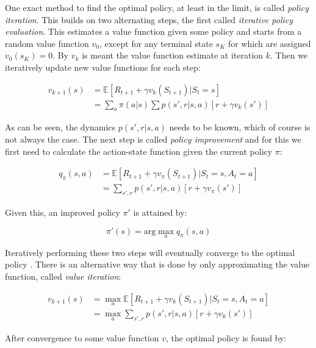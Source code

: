One exact method to find the optimal policy, at least in the limit, is called
\textit{policy iteration}. This builds on two alternating steps, the first
called \textit{iterative policy evaluation}. This estimates a value function
given some policy and starts from a random value function $v_0$, except for any
terminal state $s_K$ for which are assigned $v_0(s_K) = 0$. By $v_k$ is meant
the value function estimate at iteration $k$. Then we iteratively update new
value functions for each step:

\begin{align*}
    v_{k+1}(s) &= \mathbb{E}\left[R_{t+1} + \gamma v_{k}(S_{t+1}) | S_t=s \right] \\
               &= \sum_a \pi (a|s) \sum p(s', r|s, a) \left[r + \gamma v_k(s')\right]
\end{align*}

As can be seen, the dynamics $p(s', r|s, a)$ needs to be known, which of course
is not always the case. The next step is called \textit{policy improvement} and for this
we first need to calculate the action-state function given the current policy
$\pi$:

\begin{align*}
    q_\pi(s, a) &= \mathbb{E}\left[R_{t+1} + \gamma v_\pi(S_{t+1}) | S_t=s, A_t = a \right] \\
                &= \sum_{s', r} p(s', r|s, a) \left[r + \gamma v_\pi(s')\right]
\end{align*}

Given this, an improved policy $\pi'$ is attained by:

\begin{equation}
    \pi'(s) = \text{arg}\max_a q_\pi(s, a)
\end{equation}

Iteratively performing these two steps will eventually converge to the optimal
policy \cite{puterman1979convergence}. There is an alternative way that is done by only approximating the
value function, called \textit{value iteration}:

\begin{align*}
    v_{k+1}(s) &= \max_a \mathbb{E}\left[R_{t+1} + \gamma v_k(S_{t+1}) | S_t=s, A_t = a \right] \\
             &= \max_a \sum_{s', r} p(s', r|s, a) \left[r + \gamma v_k(s')\right]
\end{align*}

After convergence to some value function $v$, the optimal policy is found by:

